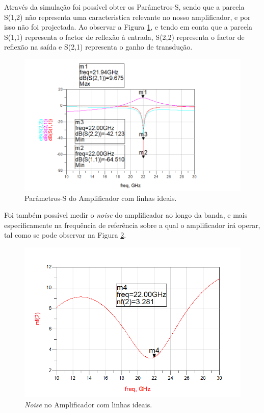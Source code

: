 \documentclass[11pt]{article}
\numberwithin{equation}{section}
\begin{document}
Através da simulação foi possível obter os Parâmetros-S, sendo que a parcela S(1,2) não representa uma caracteristica relevante no nosso amplificador, e por isso não foi projectada. Ao observar a Figura \ref{fig:ideal_S}, e tendo em conta que a parcela S(1,1) representa o factor de reflexão à entrada, S(2,2) representa o factor de reflexão na saída e S(2,1) representa o ganho de transdução.

\begin{figure}[H]
	\centering
	\includegraphics[keepaspectratio=true, scale=0.45]{exps/Ideal_S}
	\vspace{-0.5em}
	\caption{Parâmetros-S do Amplificador com linhas ideais.}
	\vspace{-0.8em}
	\label{fig:ideal_S}
\end{figure}

Foi também possível medir o \textit{noise} do amplificador ao longo da banda, e mais especificamente na frequência de referência sobre a qual o amplificador irá operar, tal como se pode observar na Figura \ref{fig:ideal_noise}.

\begin{figure}[H]
	\centering
	\includegraphics[keepaspectratio=true, scale=0.45]{exps/Ideal_noise}
	\vspace{-0.5em}
	\caption{\textit{Noise} no Amplificador com linhas ideais.}
	\vspace{-0.8em}
	\label{fig:ideal_noise}
\end{figure}
\end{document}
